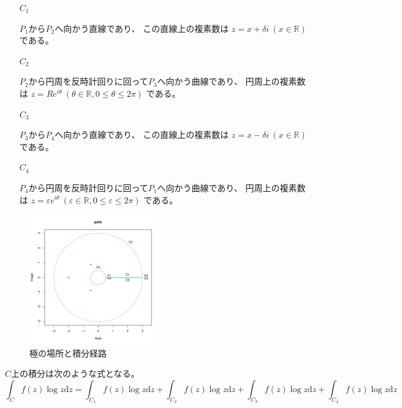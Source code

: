 \documentclass[12pt,b5paper]{ltjsarticle}
\begin{document}
\begin{enumerate}
 \item [$C_1$]

       $P_1$から$P_2$へ向かう直線であり、
       この直線上の複素数は
       $z=x+\delta i \ (x\in\mathbb{R})$
       である。

 \item [$C_2$]

       $P_2$から円周を反時計回りに回って$P_3$へ向かう曲線であり、
       円周上の複素数は
       $z=Re^{i\theta} \ (\theta\in\mathbb{R},0\leq\theta\leq2\pi)$
       である。

 \item [$C_3$]

       $P_3$から$P_4$へ向かう直線であり、
       この直線上の複素数は
       $z=x-\delta i \ (x\in\mathbb{R})$
       である。

 \item [$C_4$]


       $P_4$から円周を反時計回りに回って$P_1$へ向かう曲線であり、
       円周上の複素数は
       $z=\varepsilon e^{i\theta} \ (\varepsilon\in\mathbb{R},0\leq\varepsilon\leq2\pi)$
       である。

\end{enumerate}

\begin{figure}
\label{fig:hoge}
\centerline{\includegraphics[width=0.5\textwidth]{pole_plot_R.pdf}}
\caption{極の場所と積分経路}
\end{figure}



$C$上の積分は次のような式となる。
\begin{equation}
 \int_{C} f(z)\log{z} \mathrm{d}z
  =
 \int_{C_1} f(z)\log{z} \mathrm{d}z
 +
 \int_{C_2} f(z)\log{z} \mathrm{d}z
 +
 \int_{C_3} f(z)\log{z} \mathrm{d}z
 +
 \int_{C_4} f(z)\log{z} \mathrm{d}z
\end{equation}
\end{document}

